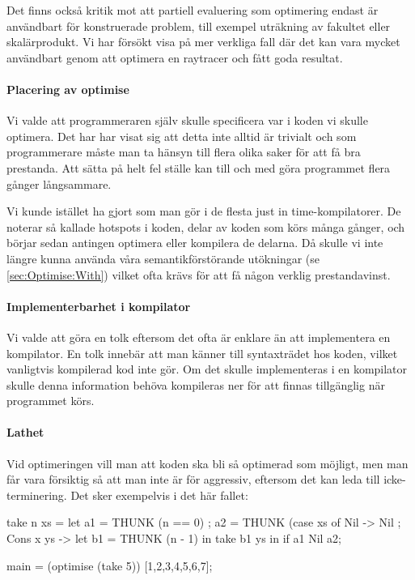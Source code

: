 \documentclass[Rapport]{subfiles}
\begin{document}
Det finns också kritik mot att partiell evaluering som optimering endast är användbart för konstruerade problem, till exempel uträkning av fakultet eller skalärprodukt. Vi har försökt visa på mer verkliga fall där det kan vara mycket användbart genom att optimera en raytracer och fått goda resultat. 


\paragraph{Placering av optimise}

Vi valde att programmeraren själv skulle  specificera var i koden vi skulle optimera. Det har har visat sig att detta inte alltid är trivialt och som programmerare måste man ta hänsyn till flera olika saker för att få bra prestanda. Att sätta  på helt fel ställe kan till och med göra programmet flera gånger långsammare.

Vi kunde istället ha gjort som man gör i de flesta just in time-kompilatorer. De noterar så kallade hotspots i koden, delar av koden som körs många gånger, och börjar sedan antingen optimera eller kompilera de delarna. Då skulle vi inte längre kunna använda våra semantikförstörande utökningar (se \ref{sec:Optimise:With}) vilket ofta krävs för att få någon verklig prestandavinst. 






\paragraph{Implementerbarhet i kompilator}
Vi valde att göra en tolk eftersom det ofta är enklare än att implementera en kompilator.
En tolk innebär att man känner till syntaxträdet hos koden, vilket vanligtvis kompilerad
kod inte gör. Om det skulle implementeras i en kompilator skulle
denna information behöva kompileras ner för att finnas tillgänglig när programmet körs.


\paragraph{Lathet}
Vid optimeringen vill man att koden ska bli så optimerad som möjligt, men man får
vara försiktig så att man inte är för aggressiv, 
eftersom det kan leda till icke-terminering. Det sker exempelvis i det här fallet:

\begin{codeEx}
take n xs = let
    { a1 = THUNK (n == 0)
    ; a2 = THUNK (case xs of
        { Nil -> Nil
        ; Cons x ys -> let
            { b1 = THUNK (n - 1)
            } in take b1 ys
        }
    } in if a1 Nil a2;

main = (optimise (take 5)) [1,2,3,4,5,6,7];
\end{codeEx}
\end{document}
